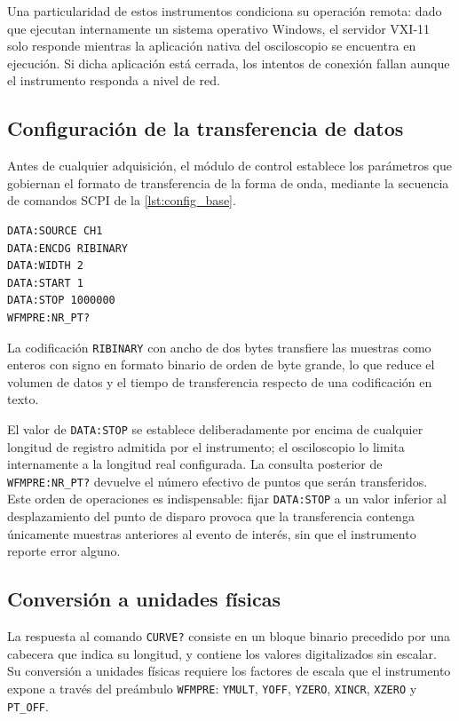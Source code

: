 Una particularidad de estos instrumentos condiciona su operación
remota: dado que ejecutan internamente un sistema operativo Windows,
el servidor VXI-11 solo responde mientras la aplicación nativa del
osciloscopio se encuentra en ejecución. Si dicha aplicación está
cerrada, los intentos de conexión fallan aunque el instrumento
responda a nivel de red.

\subsection*{Configuración de la transferencia de datos}

Antes de cualquier adquisición, el módulo de control establece los
parámetros que gobiernan el formato de transferencia de la forma de
onda, mediante la secuencia de comandos SCPI de la
\cref{lst:config_base}.

\begin{lstlisting}[caption={Configuración base de la transferencia de
                            forma de onda.},
                   label={lst:config_base},
                   language={}]
DATA:SOURCE CH1
DATA:ENCDG RIBINARY
DATA:WIDTH 2
DATA:START 1
DATA:STOP 1000000
WFMPRE:NR_PT?
\end{lstlisting}

La codificación \texttt{RIBINARY} con ancho de dos bytes transfiere
las muestras como enteros con signo en formato binario de orden de
byte grande, lo que reduce el volumen de datos y el tiempo de
transferencia respecto de una codificación en texto.

El valor de \texttt{DATA:STOP} se establece deliberadamente por
encima de cualquier longitud de registro admitida por el instrumento;
el osciloscopio lo limita internamente a la longitud real
configurada. La consulta posterior de \texttt{WFMPRE:NR\_PT?} devuelve
el número efectivo de puntos que serán transferidos. Este orden de
operaciones es indispensable: fijar \texttt{DATA:STOP} a un valor
inferior al desplazamiento del punto de disparo provoca que la
transferencia contenga únicamente muestras anteriores al evento de
interés, sin que el instrumento reporte error alguno.

\subsection*{Conversión a unidades físicas}

La respuesta al comando \texttt{CURVE?} consiste en un bloque binario
precedido por una cabecera que indica su longitud, y contiene los
valores digitalizados sin escalar. Su conversión a unidades físicas
requiere los factores de escala que el instrumento expone a través
del preámbulo \texttt{WFMPRE}: \texttt{YMULT}, \texttt{YOFF},
\texttt{YZERO}, \texttt{XINCR}, \texttt{XZERO} y \texttt{PT\_OFF}.

